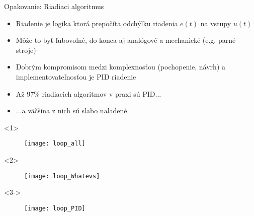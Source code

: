 \begin{frame}[t]{Opakovanie: Riadiaci algoritmus}
  \begin{itemize}
    \item<1-> Riadenie je logika ktorá prepočíta odchýlku riadenia $e(t)$ na vstupy $u(t)$
    \item<2-> Môže to byť ľubovoľné, do konca aj analógové a mechanické (e.g. parné stroje)
    \item<3-> Dobrým kompromisom medzi komplexnosťou (pochopenie, návrh) a implementovateľnosťou je PID riadenie
    \item<4-> Až 97\% riadiacich algoritmov v praxi sú PID... \citep{Murray2004}
    \item<5-> ...a väčšina z nich sú slabo naladené.
  \end{itemize}

\begin{onlyenv}<1>
\begin{figure}
\centering
  \texttt{[image: loop\_all]}\\
\end{figure}
\end{onlyenv}

\begin{onlyenv}<2>
\begin{figure}
\centering
  \texttt{[image: loop\_Whatevs]}\\
\end{figure}
\end{onlyenv}



\begin{onlyenv}<3->
\begin{figure}
\centering
  \texttt{[image: loop\_PID]}\\
\end{figure}
\end{onlyenv}
\end{frame}


